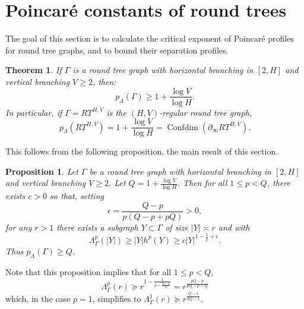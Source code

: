 \documentclass[11pt]{amsart}
\numberwithin{equation}{section}
\newtheorem{theorem}[equation]{Theorem}
\newtheorem{proposition}[equation]{Proposition}
\theoremstyle{citing}
\DeclareMathOperator{\Confdim}{Confdim}
\newcommand{\bdry}{\partial_\infty}
\newcommand{\pcrit}{p_{\Lambda}}
\numberwithin{equation}{section}
\begin{document}
\section{Poincar\'e constants of round trees}
\label{sec:reg-round-trees}

The goal of this section is to calculate the critical exponent of Poincar\'e profiles for round tree graphs, and to bound their separation profiles.

\begin{theorem}\label{thm:pcritRT}
	If $\Gamma$ is a round tree graph with horizontal branching in $[2,H]$ and vertical branching $V \geq 2$, then:
	\[
		\pcrit(\Gamma) \geq 1 + \frac{\log V}{\log H}.
	\]
	In particular, if $\Gamma = RT^{H,V}$ is the $(H,V)$-regular round tree graph,
	\[
    	\pcrit(RT^{H,V})=1+ \frac{\log V}{\log H} =\Confdim(\bdry RT^{H,V}).
    \]
\end{theorem}

This follows from the following proposition, the main result of this section.
\begin{proposition}
	\label{prop:roundtree-lower}
	Let $\Gamma$ be a round tree graph with horizontal branching in $[2,H]$ and vertical branching $V \geq 2$.  Let $Q= 1+\frac{\log V}{\log H}$.
    Then for all $1\leq p < Q$, there exists $c>0$ so that, setting \[ \epsilon = \frac{Q-p}{p(Q-p+pQ)} > 0, \]
	for any $r >1$ there exists a subgraph $Y \subset \Gamma$ of size $|Y| \asymp r$ and with
	\[
		\Lambda_\Gamma^p(|Y|) \geq |Y| h^p(Y) \geq c |Y|^{1-\frac{1}{p}+\epsilon}.
	\]
	Thus $\pcrit(\Gamma)\geq Q$.
\end{proposition}
Note that this proposition implies that for all $1\leq p < Q$,
\[
    \Lambda_\Gamma^p(r) \succeq r^{1-\frac{1}{p+ \frac{Q-p}{Q}}}= r^{\frac{pQ-p}{pQ-p+Q}}
\]
which, in the case $p=1$, simplifies to $\Lambda_\Gamma^1(r) \succeq r^\frac{Q-1}{2Q-1}$. 
\end{document}
